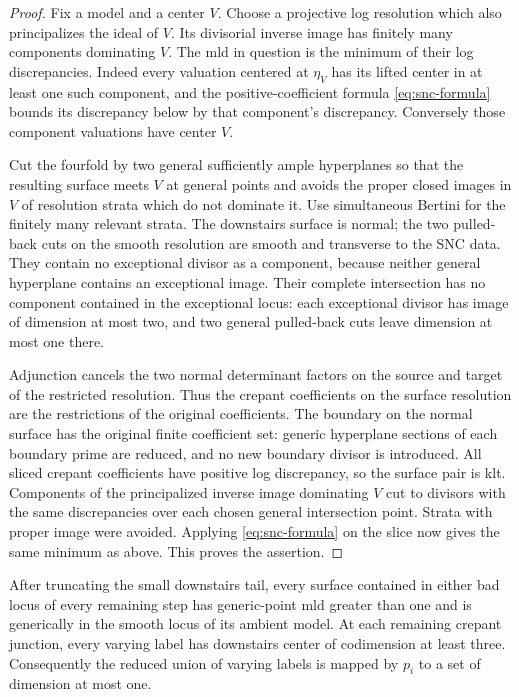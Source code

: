 \begin{proof}
Fix a model and a center $V$. Choose a projective log resolution which also principalizes the ideal of $V$. Its divisorial inverse image has finitely many components dominating $V$. The mld in question is the minimum of their log discrepancies. Indeed every valuation centered at $\eta_V$ has its lifted center in at least one such component, and the positive-coefficient formula \eqref{eq:snc-formula} bounds its discrepancy below by that component's discrepancy. Conversely those component valuations have center $V$.

Cut the fourfold by two general sufficiently ample hyperplanes so that the resulting surface meets $V$ at general points and avoids the proper closed images in $V$ of resolution strata which do not dominate it. Use simultaneous Bertini for the finitely many relevant strata. The downstairs surface is normal; the two pulled-back cuts on the smooth resolution are smooth and transverse to the SNC data. They contain no exceptional divisor as a component, because neither general hyperplane contains an exceptional image. Their complete intersection has no component contained in the exceptional locus: each exceptional divisor has image of dimension at most two, and two general pulled-back cuts leave dimension at most one there.

Adjunction cancels the two normal determinant factors on the source and target of the restricted resolution. Thus the crepant coefficients on the surface resolution are the restrictions of the original coefficients. The boundary on the normal surface has the original finite coefficient set: generic hyperplane sections of each boundary prime are reduced, and no new boundary divisor is introduced. All sliced crepant coefficients have positive log discrepancy, so the surface pair is klt. Components of the principalized inverse image dominating $V$ cut to divisors with the same discrepancies over each chosen general intersection point. Strata with proper image were avoided. Applying \eqref{eq:snc-formula} on the slice now gives the same minimum as above. This proves the assertion.
\end{proof}

\begin{proposition}\label{prop:codim-two}
After truncating the small downstairs tail, every surface contained in either bad locus of every remaining step has generic-point mld greater than one and is generically in the smooth locus of its ambient model. At each remaining crepant junction, every varying label has downstairs center of codimension at least three. Consequently the reduced union of varying labels is mapped by $p_i$ to a set of dimension at most one.
\end{proposition}

